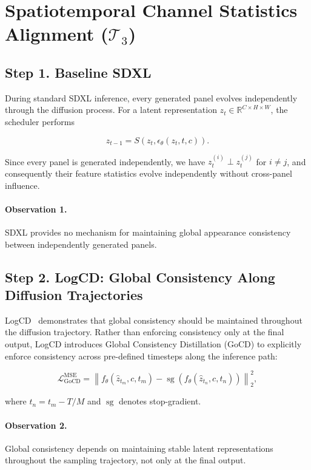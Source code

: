 \documentclass[12pt]{article}
\DeclareMathOperator{\sg}{sg}
\begin{document}
\section{Spatiotemporal Channel Statistics Alignment (\texorpdfstring{$\mathcal{T}_3$}{T3})}

\subsection{Step 1. Baseline SDXL}

During standard SDXL inference, every generated panel evolves independently through the diffusion process. For a latent representation $z_t \in \mathbb{R}^{C \times H \times W}$, the scheduler performs

\begin{equation}
z_{t-1} = S(z_t, \epsilon_\theta(z_t, t, c)).
\end{equation}

Since every panel is generated independently, we have $z_t^{(i)} \perp z_t^{(j)}$ for $i \neq j$, and consequently their feature statistics evolve independently without cross-panel influence.

\paragraph{Observation 1.}
SDXL provides no mechanism for maintaining global appearance consistency between independently generated panels.

\subsection{Step 2. LogCD: Global Consistency Along Diffusion Trajectories}

LogCD~\cite{XieCVPR2026} demonstrates that global consistency should be maintained throughout the diffusion trajectory. Rather than enforcing consistency only at the final output, LogCD introduces Global Consistency Distillation (GoCD) to explicitly enforce consistency across pre-defined timesteps along the inference path:

\begin{equation}
\mathcal{L}_{\mathrm{GoCD}}^{\mathrm{MSE}} = \left\| f_\theta(\hat{z}_{t_m}, c, t_m) - \sg\left(f_\theta(\hat{z}_{t_n}, c, t_n)\right) \right\|_2^2,
\end{equation}

where $t_n = t_m - T/M$ and $\sg$ denotes stop-gradient.

\paragraph{Observation 2.}
Global consistency depends on maintaining stable latent representations throughout the sampling trajectory, not only at the final output.
\end{document}
